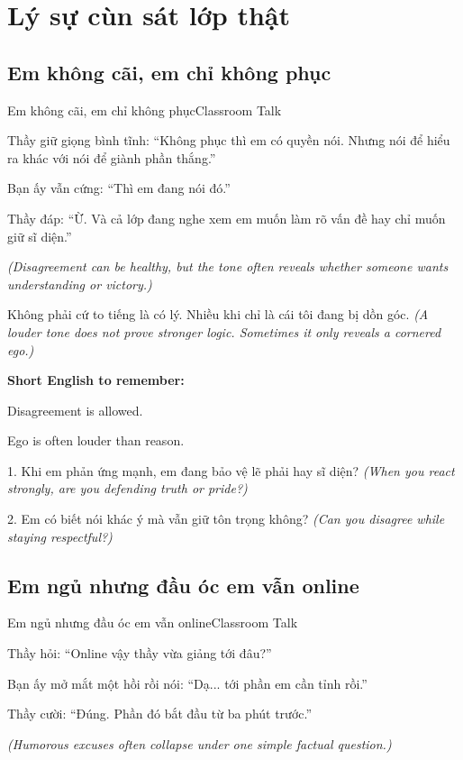 \chapter{Lý sự cùn sát lớp thật}

\section{Em không cãi, em chỉ không phục}
\begin{truyen}{Em không cãi, em chỉ không phục}{Classroom Talk}

Thầy giữ giọng bình tĩnh: ``Không phục thì em có quyền nói. Nhưng nói để hiểu ra khác với nói để giành phần thắng.''

Bạn ấy vẫn cứng: ``Thì em đang nói đó.''

Thầy đáp: ``Ừ. Và cả lớp đang nghe xem em muốn làm rõ vấn đề hay chỉ muốn giữ sĩ diện.''

\textit{(Disagreement can be healthy, but the tone often reveals whether someone wants understanding or victory.)}
\end{truyen}

\begin{baihoc}
Không phải cứ to tiếng là có lý. Nhiều khi chỉ là cái tôi đang bị dồn góc.
\textit{(A louder tone does not prove stronger logic. Sometimes it only reveals a cornered ego.)}
\end{baihoc}

\begin{ghinhoanh}
\textbf{Short English to remember:}

Disagreement is allowed.

Ego is often louder than reason.
\end{ghinhoanh}

\begin{tuhocnhanh}
1. Khi em phản ứng mạnh, em đang bảo vệ lẽ phải hay sĩ diện? \textit{(When you react strongly, are you defending truth or pride?)}

2. Em có biết nói khác ý mà vẫn giữ tôn trọng không? \textit{(Can you disagree while staying respectful?)}
\end{tuhocnhanh}
\ngancach

\section{Em ngủ nhưng đầu óc em vẫn online}
\begin{truyen}{Em ngủ nhưng đầu óc em vẫn online}{Classroom Talk}

Thầy hỏi: ``Online vậy thầy vừa giảng tới đâu?''

Bạn ấy mở mắt một hồi rồi nói: ``Dạ... tới phần em cần tỉnh rồi.''

Thầy cười: ``Đúng. Phần đó bắt đầu từ ba phút trước.''

\textit{(Humorous excuses often collapse under one simple factual question.)}
\end{truyen}

